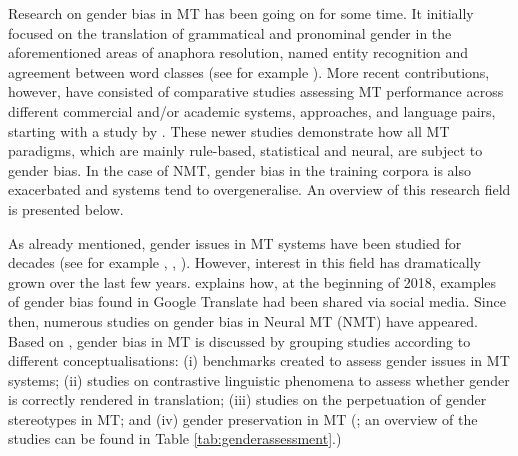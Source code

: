 Research on gender bias in MT has been going on for some time. It initially focused on the translation of grammatical and pronominal gender in the aforementioned areas of anaphora resolution, named entity recognition and agreement between word classes (see for example \cite{mitkov1999special,babych-hartley-2003-improving}). More recent contributions, however, have consisted of comparative studies assessing MT performance across different commercial and/or academic systems, approaches, and language pairs, starting with a study by \textcite{frank2004gender}. These newer studies demonstrate how all MT paradigms, which are mainly rule-based, statistical and neural, are subject to gender bias. In the case of NMT, gender bias in the training corpora is also exacerbated and systems tend to overgeneralise. An overview of this research field is presented below.


As already mentioned, gender issues in MT systems have been studied for decades (see for example \cite{mitkov1999special}, \cite{witthoft2003effects}, \cite{frank2004gender}). However, interest in this field has dramatically grown over the last few years. \textcite{olson2018algorithm} explains how, at the beginning of 2018, examples of gender bias found in Google Translate had been shared via social media. Since then, numerous studies on gender bias in Neural MT (NMT) have appeared. Based on \textcite{savoldi2021gender}, gender bias in MT is discussed by grouping studies according to different conceptualisations: (i) benchmarks created to assess gender issues in MT systems; (ii) studies on contrastive linguistic phenomena to assess whether gender is correctly rendered in translation; (iii) studies on the perpetuation of gender stereotypes in MT; and (iv) gender preservation in MT (\cite{savoldi2021gender}; an overview of the studies can be found in Table \ref{tab:genderassessment}.) %

